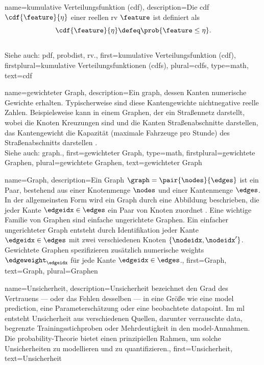 {{
{name={kumulative Verteilungsfunktion (cdf)},
	description={Die  cdf 
	$\cdf{\feature}{\eta}$ einer reellen \gls{rv} $\feature$ ist definiert als \cite{AshProbMeasure,papoulis}
	$$\cdf{\feature}{\eta} \defeq \prob{\feature \leq \eta}.$$
					\\ 
		Siehe auch: \gls{pdf}, \gls{probdist}, \gls{rv}.},
	first={kumulative Verteilungsfunktion (cdf)},
	firstplural={kumulative Verteilungsfunktionen (cdfs)}, 
	plural={cdfs}, 
	type=math,
	text={cdf} 
}

{name={gewichteter Graph},
	description={Ein \gls{graph}, dessen Kanten numerische Gewichte 
	erhalten. Typischerweise sind diese Kantengewichte nichtnegative reelle Zahlen. 
	Beispielsweise kann in einem Graphen, der ein Straßennetz darstellt, wobei die Knoten Kreuzungen 
	sind und die Kanten Straßenabschnitte darstellen, das Kantengewicht die Kapazität 
	(maximale Fahrzeuge pro Stunde) des Straßenabschnitts darstellen \cite{NewmannBook}.  
					\\ 
		Siehe auch: \gls{graph}.},
	first={gewichteter Graph},
	type=math,
	firstplural={gewichtete Graphen}, 
	plural={gewichtete Graphen}, 
	text={gewichteter Graph} 
}


{
	name={Graph},
	description={Ein  Graph $\graph = \pair{\nodes}{\edges}$ ist ein Paar, bestehend aus 
		einer Knotenmenge $\nodes$ und einer Kantenmenge $\edges$. In der allgemeinsten Form wird ein Graph durch eine Abbildung beschrieben, 
		die jeder Kante $\edgeidx \in \edges$ ein Paar von Knoten zuordnet \cite{RockNetworks}. 
		Eine wichtige Familie von Graphen sind einfache ungerichtete Graphen. Ein einfacher ungerichteter Graph entsteht durch Identifikation 
		jeder Kante $\edgeidx \in \edges$ mit zwei verschiedenen Knoten $\{\nodeidx, \nodeidx'\}$. 
		Gewichtete Graphen spezifizieren zusätzlich numerische \gls{weights} $\edgeweight_{\edgeidx}$ für jede Kante $\edgeidx \in \edges$.},
	first={Graph}, text={Graph}, plural={Graphen}
}


{
	name={Unsicherheit},
	description={Unsicherheit bezeichnet den Grad des Vertrauens — oder das Fehlen desselben — 
		in eine Größe wie eine \gls{model} \gls{prediction}, eine Parameterschätzung oder eine beobachtete \gls{datapoint}. 
		Im \gls{ml} entsteht Unsicherheit aus verschiedenen Quellen, darunter verrauschte \gls{data}, begrenzte Trainingsstichproben 
		oder Mehrdeutigkeit in den \gls{model}-Annahmen. Die \gls{probability}-Theorie bietet einen prinzipiellen Rahmen, 
		um solche Unsicherheiten zu modellieren und zu quantifizieren.},
	first={Unsicherheit}, text={Unsicherheit}
}

}}

